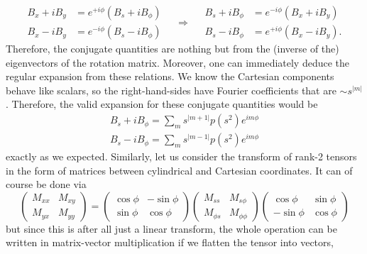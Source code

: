 \[\begin{aligned}
    B_x + iB_y &= e^{+i\phi} \left(B_s + iB_\phi\right) \\ 
    B_x - iB_y &= e^{-i\phi} \left(B_s - iB_\phi\right)
\end{aligned} \quad \Longrightarrow\quad 
\begin{aligned}
    B_s + iB_\phi &= e^{-i\phi} \left(B_x + iB_y\right) \\ 
    B_s - iB_\phi &= e^{+i\phi} \left(B_x - iB_y\right).
\end{aligned}\]
Therefore, the conjugate quantities are nothing but from the (inverse of the) eigenvectors of the rotation matrix.
Moreover, one can immediately deduce the regular expansion from these relations.
We know the Cartesian components behave like scalars, so the right-hand-sides have Fourier coefficients that are $\sim s^{|m|}$.
Therefore, the valid expansion for these conjugate quantities would be
\[\begin{aligned}
    B_s + iB_\phi = \sum_m s^{|m+1|}p(s^2) e^{im\phi} \\ 
    B_s - iB_\phi = \sum_m s^{|m-1|}p(s^2) e^{im\phi}
\end{aligned}\]
exactly as we expected.
Similarly, let us consider the transform of rank-2 tensors in the form of matrices between cylindrical and Cartesian coordinates.
It can of course be done via
\[\begin{pmatrix} M_{xx} & M_{xy} \\ M_{yx} & M_{yy} \end{pmatrix} = 
\begin{pmatrix} \cos\phi & -\sin\phi \\ \sin\phi & \cos\phi \end{pmatrix}  
\begin{pmatrix} M_{ss} & M_{s\phi} \\ M_{\phi s} & M_{\phi \phi} \end{pmatrix}
\begin{pmatrix} \cos\phi & \sin\phi \\ -\sin\phi & \cos\phi \end{pmatrix}
\]
but since this is after all just a linear transform, the whole operation can be written in matrix-vector multiplication if we flatten the tensor into vectors,

